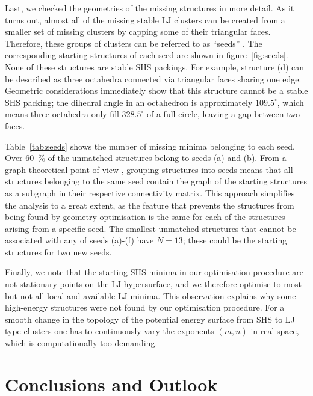 Last, we checked the geometries of the missing structures in more detail.
As it turns out, almost all of the missing stable LJ clusters can be created
from a smaller set of missing clusters by capping some of their triangular
faces. Therefore, these groups of clusters can be referred to as ``seeds''
\autocite{Arkus_DerivingFiniteSphere_2011}. The corresponding starting structures of each seed
are shown in figure~\ref{fig:seeds}. 
None of these structures are stable \ac{SHS} packings. For
example, structure (d) can be described as three octahedra connected via
triangular faces sharing one edge. Geometric considerations \autocite{Arkus_DerivingFiniteSphere_2011,Hoy_Structurefinitesphere_2012} immediately show
that this structure cannot be a stable \ac{SHS} packing;
the dihedral angle in an octahedron is approximately $109.5^\circ$, which means three
octahedra only fill $328.5^\circ$ of a full circle, leaving a gap between two
faces. 


Table~\ref{tab:seeds} shows the number of missing minima belonging to each seed.
Over 60~\% of the unmatched structures belong to seeds (a) and (b).  
From a graph theoretical point of view \autocite{Arkus_Minimalenergyclusters_2009,Arkus_DerivingFiniteSphere_2011},
grouping structures into seeds means that all structures belonging to the same
seed contain the graph of the starting structures as a subgraph in their
respective connectivity matrix.  This approach simplifies the analysis to a
great extent, as the feature that prevents the structures from being found by
geometry optimisation is the same for each of the structures arising from a
specific seed.  
The smallest unmatched structures that cannot be associated with any of seeds (a)-(f) have $N=13$;
these could be the starting structures for two new seeds.


Finally, we note that the starting \ac{SHS} minima in our optimisation procedure are
not stationary points on the LJ hypersurface, and we therefore optimise to most
but not all local and available LJ minima. This observation explains why some high-energy
structures were not found by our optimisation procedure. For a smooth change in the topology of the potential energy surface
from \ac{SHS} to LJ type clusters one has to continuously vary the exponents $(m,n)$
in real space, which is computationally too demanding.

\section{Conclusions and Outlook}

